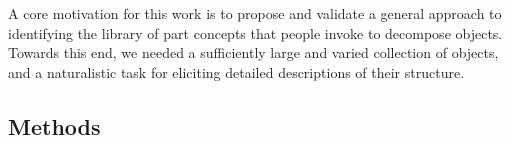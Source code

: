 \documentclass[10pt,letterpaper]{article}
\begin{document}




A core motivation for this work is to propose and validate a general approach to identifying the library of part concepts that people invoke to decompose objects. 
Towards this end, we needed a sufficiently large and varied collection of objects, and a naturalistic task for eliciting detailed descriptions of their structure. 


\subsection{Methods}
\end{document}
